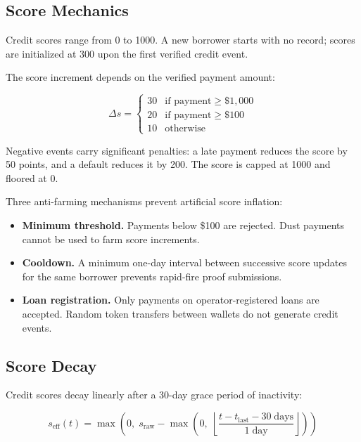 \documentclass[11pt,a4paper]{article}
\begin{document}
\subsection{Score Mechanics}

Credit scores range from 0 to 1000. A new borrower starts with no record; scores are initialized at 300 upon the first verified credit event.

The score increment depends on the verified payment amount:

\begin{equation}
\Delta s = \begin{cases}
  30 & \text{if payment} \geq \$1{,}000 \\
  20 & \text{if payment} \geq \$100 \\
  10 & \text{otherwise}
\end{cases}
\end{equation}

Negative events carry significant penalties: a late payment reduces the score by 50 points, and a default reduces it by 200. The score is capped at 1000 and floored at 0.

Three anti-farming mechanisms prevent artificial score inflation:
\begin{itemize}
\item \textbf{Minimum threshold.} Payments below \$100 are rejected. Dust payments cannot be used to farm score increments.
\item \textbf{Cooldown.} A minimum one-day interval between successive score updates for the same borrower prevents rapid-fire proof submissions.
\item \textbf{Loan registration.} Only payments on operator-registered loans are accepted. Random token transfers between wallets do not generate credit events.
\end{itemize}

\subsection{Score Decay}

Credit scores decay linearly after a 30-day grace period of inactivity:

\begin{equation}
s_{\text{eff}}(t) = \max\!\left(0,\; s_{\text{raw}} - \max\!\left(0,\; \left\lfloor\frac{t - t_{\text{last}} - 30\;\text{days}}{1\;\text{day}}\right\rfloor\right)\right)
\end{equation}
\end{document}
